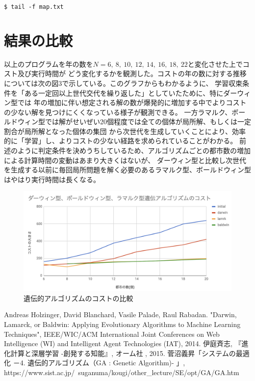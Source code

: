 \documentclass[uplatex]{jsarticle}
\begin{document}
\begin{lstlisting}[basicstyle=\ttfamily\footnotesize, frame=single]
  $ tail -f map.txt
\end{lstlisting}

\section{結果の比較}
以上のプログラムを年の数を$N = 6,\ 8,\ 10,\ 12,\ 14,\ 16,\ 18,\ 22$と変化させた上でコスト及び実行時間が
どう変化するかを観測した。コストの年の数に対する推移については次の図3で示している。このグラフからもわかるように、
学習収束条件を「ある一定回以上世代交代を繰り返した」としていたために、特にダーウィン型では
年の増加に伴い想定される解の数が爆発的に増加する中でよりコストの少ない解を見つけにくくなっている様子が観測できる。
一方ラマルク、ボールドウィン型では解がせいぜい20個程度では全ての個体が局所解、もしくは一定割合が局所解となった個体の集団
から次世代を生成していくことにより、効率的に「学習」し、よりコストの少ない経路を求められていることがわかる。
前述のように判定条件を決めうちしているため、アルゴリズムごとの都市数の増加による計算時間の変動はあまり大きくはないが、
ダーウィン型と比較し次世代を生成する以前に毎回局所問題を解く必要のあるラマルク型、ボールドウィン型はやはり実行時間は長くなる。

\begin{figure}
  \begin{center}
    \includegraphics[width=17cm]{ga_cost.png}
    \caption{遺伝的アルゴリズムのコストの比較}
  \end{center}
\end{figure}

\begin{thebibliography}{9}
   Andreas Holzinger, David Blanchard, Vasile Palade, Raul Rabadan.
    "Darwin, Lamarck, or Baldwin: Applying Evolutionary Algorithms to Machine Learning Techniques",  IEEE/WIC/ACM International Joint Conferences on Web Intelligence (WI) and Intelligent Agent Technologies (IAT), 2014.
   伊庭斉志,
    『進化計算と深層学習 -創発する知能』, オーム社 , 2015.
  菅沼義昇「システムの最適化 －4. 遺伝的アルゴリズム（GA : Genetic Algorithm)- 」, https://www.sist.ac.jp/~suganuma/kougi/other\_lecture/SE/opt/GA/GA.htm
\end{thebibliography}
\end{document}

